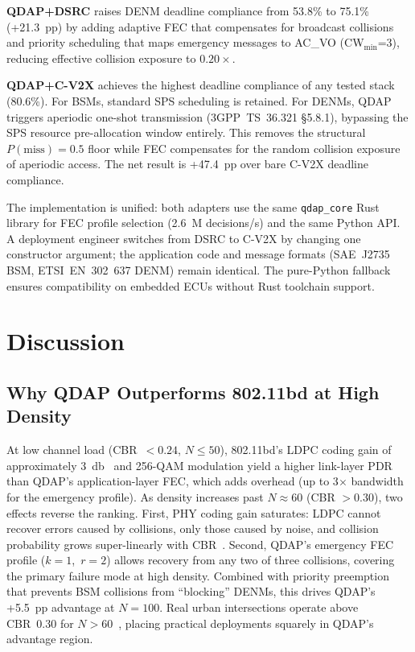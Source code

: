 \documentclass[journal]{IEEEtran}
\begin{document}
\textbf{QDAP+DSRC} raises DENM deadline compliance from 53.8\% to 75.1\%
(+21.3~pp) by adding adaptive FEC that compensates for broadcast collisions
and priority scheduling that maps emergency messages to AC\_VO
(CW$_{\min}$=3), reducing effective collision exposure to $0.20\times$.

\textbf{QDAP+C-V2X} achieves the highest deadline compliance of any tested
stack (80.6\%).
For BSMs, standard SPS scheduling is retained.
For DENMs, QDAP triggers aperiodic one-shot transmission (3GPP~TS~36.321
\S{}5.8.1), bypassing the SPS resource pre-allocation window entirely.
This removes the structural $P(\text{miss}) = 0.5$ floor while FEC
compensates for the random collision exposure of aperiodic access.
The net result is +47.4~pp over bare C-V2X deadline compliance.

The implementation is unified: both adapters use the same
\texttt{qdap\_core} Rust library for FEC profile selection
(2.6~M decisions/s) and the same Python API.
A deployment engineer switches from DSRC to C-V2X by changing one
constructor argument; the application code and message formats
(SAE~J2735 BSM, ETSI~EN~302~637 DENM) remain identical.
The pure-Python fallback ensures compatibility on embedded ECUs
without Rust toolchain support.


\section{Discussion}
\label{sec:discussion}

\subsection{Why QDAP Outperforms 802.11bd at High Density}

At low channel load (CBR~$< 0.24$, $N \leq 50$), 802.11bd's LDPC coding
gain of approximately \SI{3}{\decibel}~\cite{IEEE_80211bd_2022} and 256-QAM
modulation yield a higher link-layer PDR than QDAP's application-layer FEC,
which adds overhead (up to 3$\times$ bandwidth for the emergency profile).
As density increases past $N \approx 60$ (CBR $> 0.30$), two effects reverse
the ranking.
First, PHY coding gain saturates: LDPC cannot recover errors caused by
collisions, only those caused by noise, and collision probability grows
super-linearly with CBR~\cite{Sepulcre2011}.
Second, QDAP's emergency FEC profile (\mbox{$k{=}1$, $r{=}2$}) allows
recovery from any two of three collisions, covering the primary failure mode
at high density.
Combined with priority preemption that prevents BSM collisions from
``blocking'' DENMs, this drives QDAP's +5.5~pp advantage at $N{=}100$.
Real urban intersections operate above CBR~0.30 for $N > 60$~\cite{Lyu2021},
placing practical deployments squarely in QDAP's advantage region.
\end{document}
